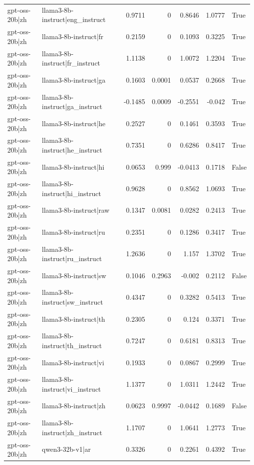 \begin{table}
\begin{tabular}{l l r r r r l}
gpt-oss-20b|zh & llama3-8b-instruct|eng_instruct & 0.9711 & 0 & 0.8646 & 1.0777 & True \\
gpt-oss-20b|zh & llama3-8b-instruct|fr & 0.2159 & 0 & 0.1093 & 0.3225 & True \\
gpt-oss-20b|zh & llama3-8b-instruct|fr_instruct & 1.1138 & 0 & 1.0072 & 1.2204 & True \\
gpt-oss-20b|zh & llama3-8b-instruct|ga & 0.1603 & 0.0001 & 0.0537 & 0.2668 & True \\
gpt-oss-20b|zh & llama3-8b-instruct|ga_instruct & -0.1485 & 0.0009 & -0.2551 & -0.042 & True \\
gpt-oss-20b|zh & llama3-8b-instruct|he & 0.2527 & 0 & 0.1461 & 0.3593 & True \\
gpt-oss-20b|zh & llama3-8b-instruct|he_instruct & 0.7351 & 0 & 0.6286 & 0.8417 & True \\
gpt-oss-20b|zh & llama3-8b-instruct|hi & 0.0653 & 0.999 & -0.0413 & 0.1718 & False \\
gpt-oss-20b|zh & llama3-8b-instruct|hi_instruct & 0.9628 & 0 & 0.8562 & 1.0693 & True \\
gpt-oss-20b|zh & llama3-8b-instruct|raw & 0.1347 & 0.0081 & 0.0282 & 0.2413 & True \\
gpt-oss-20b|zh & llama3-8b-instruct|ru & 0.2351 & 0 & 0.1286 & 0.3417 & True \\
gpt-oss-20b|zh & llama3-8b-instruct|ru_instruct & 1.2636 & 0 & 1.157 & 1.3702 & True \\
gpt-oss-20b|zh & llama3-8b-instruct|sw & 0.1046 & 0.2963 & -0.002 & 0.2112 & False \\
gpt-oss-20b|zh & llama3-8b-instruct|sw_instruct & 0.4347 & 0 & 0.3282 & 0.5413 & True \\
gpt-oss-20b|zh & llama3-8b-instruct|th & 0.2305 & 0 & 0.124 & 0.3371 & True \\
gpt-oss-20b|zh & llama3-8b-instruct|th_instruct & 0.7247 & 0 & 0.6181 & 0.8313 & True \\
gpt-oss-20b|zh & llama3-8b-instruct|vi & 0.1933 & 0 & 0.0867 & 0.2999 & True \\
gpt-oss-20b|zh & llama3-8b-instruct|vi_instruct & 1.1377 & 0 & 1.0311 & 1.2442 & True \\
gpt-oss-20b|zh & llama3-8b-instruct|zh & 0.0623 & 0.9997 & -0.0442 & 0.1689 & False \\
gpt-oss-20b|zh & llama3-8b-instruct|zh_instruct & 1.1707 & 0 & 1.0641 & 1.2773 & True \\
gpt-oss-20b|zh & qwen3-32b-v1|ar & 0.3326 & 0 & 0.2261 & 0.4392 & True \\

\end{tabular}
\end{table}
